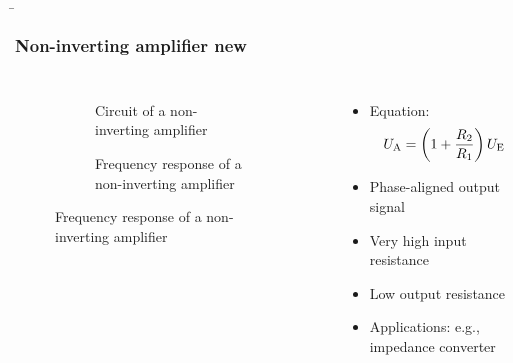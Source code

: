 \begin{frame}
    \b{
    \frametitle{Non-inverting amplifier new}
    \begin{columns}
        \centering
        \begin{figure}
    \centering

    \begin{subfigure}{\linewidth}
        \centering
        \resizebox{0.6\linewidth}{!}{}
        \caption{Circuit of a non-inverting amplifier}
    \end{subfigure}

    \vspace{0.5cm} 

    \begin{subfigure}{\linewidth}
        \centering
        \resizebox{0.6\linewidth}{!}{}
        \caption{Frequency response of a non-inverting amplifier}
    \end{subfigure}

\end{figure}

        \begin{itemize}
            \item Equation:
            \[
            U_{\textnormal{A}} = \left(1+\frac{R_2}{R_1}\right) U_{\textnormal{E}}
            \]
            \item Phase-aligned output signal
            \item Very high input resistance
            \item Low output resistance
            \item Applications: e.g., impedance converter
        \end{itemize}
    \end{columns}
    }
\end{frame}


